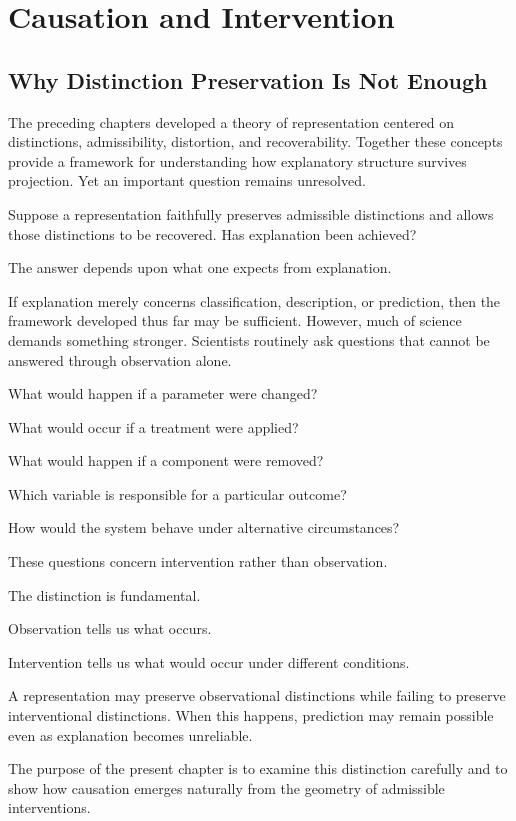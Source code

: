 \documentclass[11pt,oneside,openany]{book}
\begin{document}
\chapter{Causation and Intervention}

\section{Why Distinction Preservation Is Not Enough}

The preceding chapters developed a theory of representation centered on distinctions, admissibility, distortion, and recoverability. Together these concepts provide a framework for understanding how explanatory structure survives projection. Yet an important question remains unresolved.

Suppose a representation faithfully preserves admissible distinctions and allows those distinctions to be recovered. Has explanation been achieved?

The answer depends upon what one expects from explanation.

If explanation merely concerns classification, description, or prediction, then the framework developed thus far may be sufficient. However, much of science demands something stronger. Scientists routinely ask questions that cannot be answered through observation alone.

What would happen if a parameter were changed?

What would occur if a treatment were applied?

What would happen if a component were removed?

Which variable is responsible for a particular outcome?

How would the system behave under alternative circumstances?

These questions concern intervention rather than observation.

The distinction is fundamental.

Observation tells us what occurs.

Intervention tells us what would occur under different conditions.

A representation may preserve observational distinctions while failing to preserve interventional distinctions. When this happens, prediction may remain possible even as explanation becomes unreliable.

The purpose of the present chapter is to examine this distinction carefully and to show how causation emerges naturally from the geometry of admissible interventions.
\end{document}
